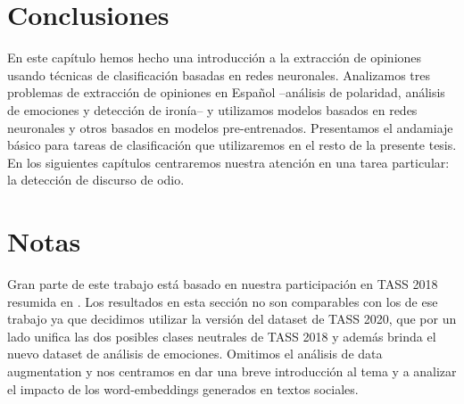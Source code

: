 \section{Conclusiones}

En este capítulo hemos hecho una introducción a la extracción de opiniones usando técnicas de clasificación basadas en redes neuronales. Analizamos tres problemas de extracción de opiniones en Español --análisis de polaridad, análisis de emociones y detección de ironía-- y utilizamos modelos basados en redes neuronales y otros basados en modelos pre-entrenados. Presentamos el andamiaje básico para tareas de clasificación que utilizaremos en el resto de la presente tesis. En los siguientes capítulos centraremos nuestra atención en una tarea particular: la detección de discurso de odio.

\section{Notas}

Gran parte de este trabajo está basado en nuestra participación en TASS 2018\cite{overview_tass2018} resumida en \citet{atalaya_tass2018}. Los resultados en esta sección no son comparables con los de ese trabajo ya que decidimos utilizar la versión del dataset de TASS 2020\cite{garcia2020overview}, que por un lado unifica las dos posibles clases neutrales de TASS 2018 y además brinda el nuevo dataset de análisis de emociones. Omitimos el análisis de data augmentation y nos centramos en dar una breve introducción al tema y a analizar el impacto de los word-embeddings generados en textos sociales.
